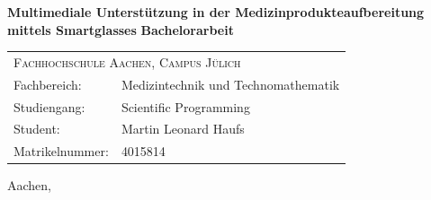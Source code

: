%
%
%
%
\begin{titlepage}
	\begin{flushright}
		\textbf{\Large Multimediale Unterstützung in der Medizinprodukteaufbereitung mittels Smartglasses}
		\linebreak
		\linebreak
		\textbf{\Large Bachelorarbeit}
		\linebreak
		\linebreak
	\end{flushright}
	\vfill
	\begin{tabular*}{\linewidth}{ll}
	    \multicolumn{2}{l}{\textsc{Fachhochschule Aachen, Campus Jülich}}\\
		Fachbereich: & Medizintechnik und Technomathematik\\
		Studiengang: & Scientific Programming\\
		Student: & Martin Leonard Haufs\\ 
		Matrikelnummer: & 4015814
	\end{tabular*}
	\vfill	
	\centering\large Aachen, \dateOfSubmission %
\end{titlepage}